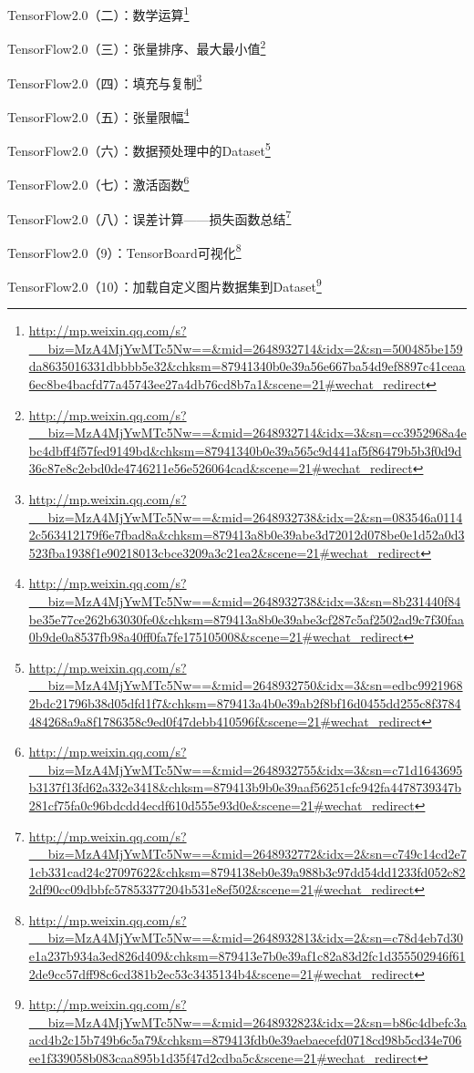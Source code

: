 \documentclass[]{ctexbook}
\renewcommand{\href}[2]{#2\footnote{\url{#1}}}
\begin{document}
\href{http://mp.weixin.qq.com/s?__biz=MzA4MjYwMTc5Nw==\&mid=2648932714\&idx=2\&sn=500485be159da8635016331dbbbb5e32\&chksm=87941340b0e39a56e667ba54d9ef8897c41ceaa6ec8be4bacfd77a45743ee27a4db76cd8b7a1\&scene=21\#wechat_redirect}{TensorFlow2.0（二）：数学运算}

\href{http://mp.weixin.qq.com/s?__biz=MzA4MjYwMTc5Nw==\&mid=2648932714\&idx=3\&sn=cc3952968a4ebc4dbff4f57fed9149bd\&chksm=87941340b0e39a565c9d441af5f86479b5b3f0d9d36c87e8c2ebd0de4746211e56e526064cad\&scene=21\#wechat_redirect}{TensorFlow2.0（三）：张量排序、最大最小值}

\href{http://mp.weixin.qq.com/s?__biz=MzA4MjYwMTc5Nw==\&mid=2648932738\&idx=2\&sn=083546a01142c563412179f6e7fbad8a\&chksm=879413a8b0e39abe3d72012d078be0e1d52a0d3523fba1938f1e90218013cbce3209a3c21ea2\&scene=21\#wechat_redirect}{TensorFlow2.0（四）：填充与复制}

\href{http://mp.weixin.qq.com/s?__biz=MzA4MjYwMTc5Nw==\&mid=2648932738\&idx=3\&sn=8b231440f84be35e77ce262b63030fe0\&chksm=879413a8b0e39abe3cf287c5af2502ad9c7f30faa0b9de0a8537fb98a40ff0fa7fe175105008\&scene=21\#wechat_redirect}{TensorFlow2.0（五）：张量限幅}

\href{http://mp.weixin.qq.com/s?__biz=MzA4MjYwMTc5Nw==\&mid=2648932750\&idx=3\&sn=edbc99219682bdc21796b38d05dfd1f7\&chksm=879413a4b0e39ab2f8bf16d0455dd255c8f3784484268a9a8f1786358c9ed0f47debb410596f\&scene=21\#wechat_redirect}{TensorFlow2.0（六）：数据预处理中的Dataset}

\href{http://mp.weixin.qq.com/s?__biz=MzA4MjYwMTc5Nw==\&mid=2648932755\&idx=3\&sn=c71d1643695b3137f13fd62a332e3418\&chksm=879413b9b0e39aaf56251cfc942fa4478739347b281cf75fa0c96bdcdd4ecdf610d555e93d0e\&scene=21\#wechat_redirect}{TensorFlow2.0（七）：激活函数}

\href{http://mp.weixin.qq.com/s?__biz=MzA4MjYwMTc5Nw==\&mid=2648932772\&idx=2\&sn=c749c14cd2e71cb331cad24c27097622\&chksm=8794138eb0e39a988b3c97dd54dd1233fd052c822df90cc09dbbfc57853377204b531e8ef502\&scene=21\#wechat_redirect}{TensorFlow2.0（八）：误差计算------损失函数总结}

\href{http://mp.weixin.qq.com/s?__biz=MzA4MjYwMTc5Nw==\&mid=2648932813\&idx=2\&sn=c78d4eb7d30e1a237b934a3ed826d409\&chksm=879413e7b0e39af1c82a83d2fc1d355502946f612de9cc57dff98c6cd381b2ec53c3435134b4\&scene=21\#wechat_redirect}{TensorFlow2.0（9）：TensorBoard可视化}

\href{http://mp.weixin.qq.com/s?__biz=MzA4MjYwMTc5Nw==\&mid=2648932823\&idx=2\&sn=b86c4dbefc3aacd4b2c15b749b6c5a79\&chksm=879413fdb0e39aebaecefd0718cd98b5cd34e706ee1f339058b083caa895b1d35f47d2cdba5c\&scene=21\#wechat_redirect}{TensorFlow2.0（10）：加载自定义图片数据集到Dataset}
\end{document}
